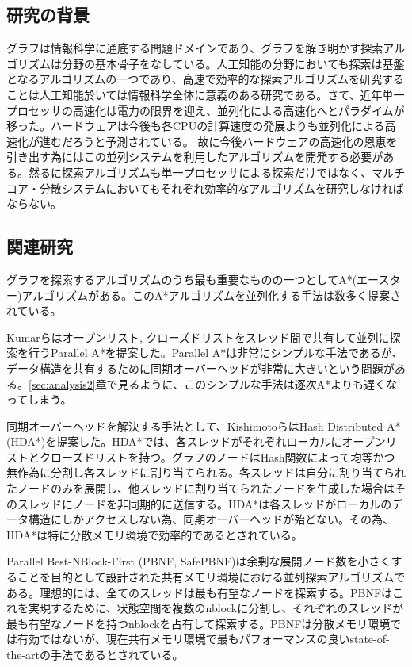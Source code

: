 \documentclass[uplatex]{jsarticle}
\begin{document}
\subsection{研究の背景}
グラフは情報科学に通底する問題ドメインであり、グラフを解き明かす探索アルゴリズムは分野の基本骨子をなしている。人工知能の分野においても探索は基盤となるアルゴリズムの一つであり、高速で効率的な探索アルゴリズムを研究することは人工知能於いては情報科学全体に意義のある研究である。さて、近年単一プロセッサの高速化は電力の限界を迎え、並列化による高速化へとパラダイムが移った。ハードウェアは今後も各CPUの計算速度の発展よりも並列化による高速化が進むだろうと予測されている。
故に今後ハードウェアの高速化の恩恵を引き出す為にはこの並列システムを利用したアルゴリズムを開発する必要がある。然るに探索アルゴリズムも単一プロセッサによる探索だけではなく、マルチコア・分散システムにおいてもそれぞれ効率的なアルゴリズムを研究しなければならない。


\subsection{関連研究}

グラフを探索するアルゴリズムのうち最も重要なものの一つとしてA*(エースター)アルゴリズムがある\cite{Hart1968}。このA*アルゴリズムを並列化する手法は数多く提案されている。


Kumarらはオープンリスト, クローズドリストをスレッド間で共有して並列に探索を行うParallel A*を提案した。Parallel A*は非常にシンプルな手法であるが、データ構造を共有するために同期オーバーヘッドが非常に大きいという問題がある。\ref{sec:analysis2}章で見るように、このシンプルな手法は逐次A*よりも遅くなってしまう。

同期オーバーヘッドを解決する手法として、KishimotoらはHash Distributed A* (HDA*)を提案した\cite{Kishimoto2013}。HDA*では、各スレッドがそれぞれローカルにオープンリストとクローズドリストを持つ。グラフのノードはHash関数によって均等かつ無作為に分割し各スレッドに割り当てられる。各スレッドは自分に割り当てられたノードのみを展開し、他スレッドに割り当てられたノードを生成した場合はそのスレッドにノードを非同期的に送信する。HDA*は各スレッドがローカルのデータ構造にしかアクセスしない為、同期オーバーヘッドが殆どない。その為、HDA*は特に分散メモリ環境で効率的であるとされている。

Parallel Best-NBlock-First (PBNF, SafePBNF)は余剰な展開ノード数を小さくすることを目的として設計された共有メモリ環境における並列探索アルゴリズムである\cite{Burns2010}。理想的には、全てのスレッドは最も有望なノードを探索する。PBNFはこれを実現するために、状態空間を複数のnblockに分割し、それぞれのスレッドが最も有望なノードを持つnblockを占有して探索する。PBNFは分散メモリ環境では有効ではないが、現在共有メモリ環境で最もパフォーマンスの良いstate-of-the-artの手法であるとされている。
\end{document}
